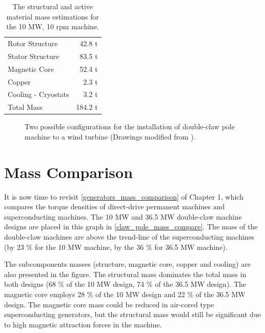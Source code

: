 \documentclass[final,peerreview,onecolumn]{IEEEtran}
\begin{document}
\begin{table}
  \centering
  \begin{tabular}{lr}
\hline
Rotor Structure & 42.8 t \\
Stator Structure & 83.5 t \\
\hline
Magnetic Core & 52.4 t\\
Copper & 2.3 t\\
Cooling - Cryostats & 3.2 t \\
\hline
Total Mass & 184.2 t \\
\hline
 \end{tabular}
  \caption{The structural and active material mass estimations for the 10 MW, 10 rpm machine.}
  \label{10MW_total_mass}
\end{table}

\begin{figure}[h!]
  \centering
  \hfill
   \caption{Two possible configurations for the installation of double-claw pole machine to a wind turbine (Drawings modified from \cite{Bang2010}).} 
    \label{DD_claw_pole_structures}
\end{figure}

\section{Mass Comparison}

It is now time to revisit \autoref{generators_mass_comparison} of Chapter 1, which compares the torque densities of direct-drive permanent machines and superconducting machines. The 10 MW and 36.5 MW double-claw machine designs are placed in this graph in \autoref{claw_pole_mass_compare}. The mass of the double-claw machines are above the trend-line of the superconducting machines (by 23 \% for the 10 MW machine, by the 36 \% for 36.5 MW machine).

The subcomponents masses (structure, magnetic core, copper and cooling) are also presented in the figure. The structural mass dominates the total mass in both designs (68 \% of the 10 MW design, 74 \% of the 36.5 MW design). The magnetic core employs 28 \% of the 10 MW design and 22 \% of the 36.5 MW design. The magnetic core mass could be reduced in air-cored type superconducting generators, but the structural mass would still be significant due to high magnetic attraction forces in the machine.
\end{document}
